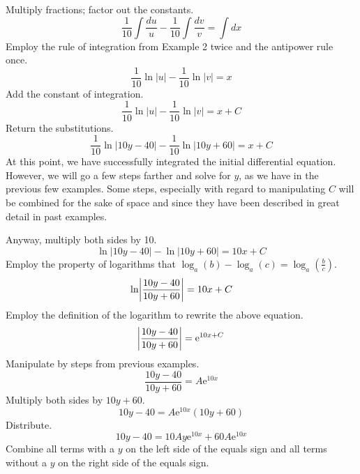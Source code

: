 \documentclass{article}
\newcounter{example}%
\begin{document}
Multiply fractions; factor out the constants.
\begin{equation*}
    \frac{1}{10}\int \frac{du}{u}-\frac{1}{10}\int \frac{dv}{v}=\int dx
\end{equation*}
Employ the rule of integration from Example 2 twice and the antipower rule once.
\begin{equation*}
    \frac{1}{10}\ln|u|-\frac{1}{10}\ln|v|=x
\end{equation*}
Add the constant of integration.
\begin{equation*}
    \frac{1}{10}\ln|u|-\frac{1}{10}\ln|v|=x+C
\end{equation*}
Return the substitutions.
\begin{equation*}
    \frac{1}{10}\ln|10y-40|-\frac{1}{10}\ln|10y+60|=x+C
\end{equation*}
At this point, we have successfully integrated the initial differential equation. However, we will go a few steps farther and solve for $y$, as we have in the previous few examples. Some steps, especially with regard to manipulating $C$ will be combined for the sake of space and since they have been described in great detail in past examples.\par
Anyway, multiply both sides by 10.
\begin{equation*}
    \ln|10y-40|-\ln|10y+60|=10x+C
\end{equation*}
Employ the property of logarithms that $\log_a(b)-\log_a(c)=\log_a\left(\frac{b}{c}\right)$.
\begin{equation*}
    \ln\abs{\frac{10y-40}{10y+60}}=10x+C
\end{equation*}
Employ the definition of the logarithm to rewrite the above equation.
\begin{equation*}
    \abs{\frac{10y-40}{10y+60}}=\text{e}^{10x+C}
\end{equation*}
Manipulate by steps from previous examples.
\begin{equation*}
    \frac{10y-40}{10y+60}=A\text{e}^{10x}
\end{equation*}
Multiply both sides by $10y+60$.
\begin{equation*}
    10y-40=A\text{e}^{10x}(10y+60)
\end{equation*}
Distribute.
\begin{equation*}
    10y-40=10Ay\text{e}^{10x}+60A\text{e}^{10x}
\end{equation*}
Combine all terms with a $y$ on the left side of the equals sign and all terms without a $y$ on the right side of the equals sign.
\end{document}
